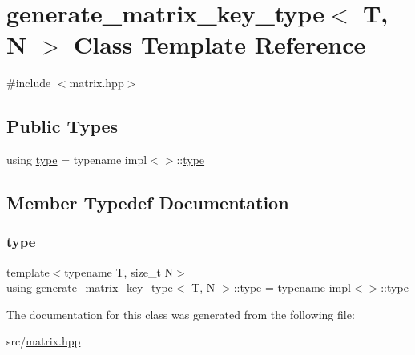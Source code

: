 \hypertarget{classgenerate__matrix__key__type}{}\section{generate\+\_\+matrix\+\_\+key\+\_\+type$<$ T, N $>$ Class Template Reference}
\label{classgenerate__matrix__key__type}


{\ttfamily \#include $<$matrix.\+hpp$>$}

\subsection*{Public Types}
\begin{DoxyCompactItemize}
\item 
using \hyperlink{classgenerate__matrix__key__type_a28fd3dfdcb4a6a3d6af023650212dfeb}{type} = typename impl$<$$>$\+::\hyperlink{classgenerate__matrix__key__type_a28fd3dfdcb4a6a3d6af023650212dfeb}{type}
\end{DoxyCompactItemize}


\subsection{Member Typedef Documentation}
\mbox{\label{classgenerate__matrix__key__type_a28fd3dfdcb4a6a3d6af023650212dfeb}} 
\subsubsection{\texorpdfstring{type}{type}}
{\footnotesize\ttfamily template$<$typename T, size\+\_\+t N$>$ \\
using \hyperlink{classgenerate__matrix__key__type}{generate\+\_\+matrix\+\_\+key\+\_\+type}$<$ T, N $>$\+::\hyperlink{classgenerate__matrix__key__type_a28fd3dfdcb4a6a3d6af023650212dfeb}{type} =  typename impl$<$$>$\+::\hyperlink{classgenerate__matrix__key__type_a28fd3dfdcb4a6a3d6af023650212dfeb}{type}}



The documentation for this class was generated from the following file\+:\begin{DoxyCompactItemize}
\item 
src/\hyperlink{matrix_8hpp}{matrix.\+hpp}\end{DoxyCompactItemize}
